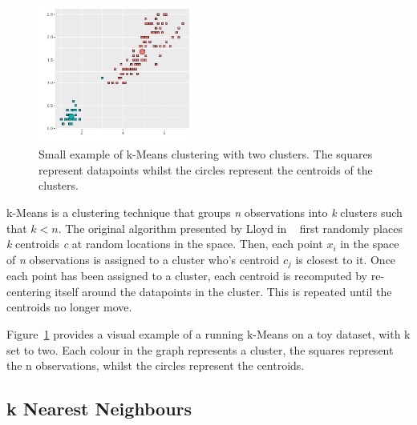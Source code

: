 \begin{figure}[t]
    \centering
    \includegraphics[width=0.45\textwidth]{background/graphics/smallest_clust_example.pdf}
    \caption{Small example of k-Means clustering with two clusters. The squares represent datapoints whilst the circles represent the centroids of the clusters.}
    \label{fig:kmeanex}
\end{figure}

k-Means is a clustering technique that groups \textit{n} observations into \textit{k} clusters such that $k < n$.
The original algorithm presented by Lloyd in ~\cite{kMeans} first randomly places \textit{k} centroids \textit{c} at random locations in the space.
Then, each point \textit{$x_{i}$} in the space of \textit{n} observations is assigned to a cluster who's centroid \textit{$c_{j}$} is closest to it.
Once each point has been assigned to a cluster, each centroid is recomputed by re-centering itself around the datapoints in the cluster.
This is repeated until the centroids no longer move.
 
Figure~\ref{fig:kmeanex} provides a visual example of a running k-Means on a toy dataset, with k set to two.
Each colour in the graph represents a cluster, the squares represent the n observations, whilst the circles represent the centroids.

\subsection{k Nearest Neighbours}~\label{sec:kNN}


